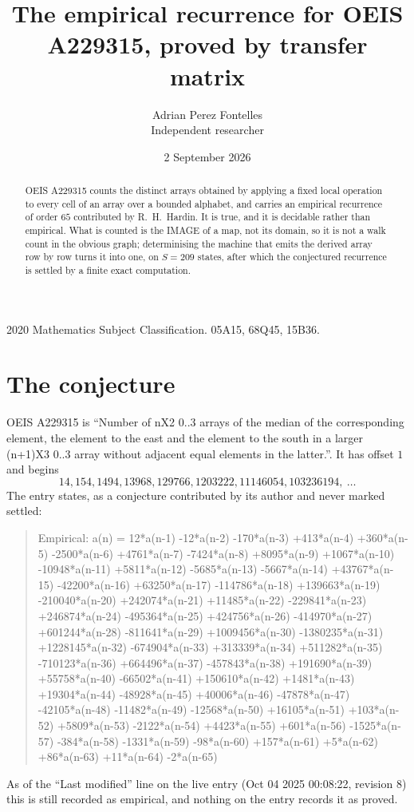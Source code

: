 \documentclass[11pt,a4paper]{article}
\title{The empirical recurrence for OEIS A229315, proved by transfer matrix}
\author{Adrian Perez Fontelles\\ \small Independent researcher}
\date{2 September 2026}
\theoremstyle{plain}
\theoremstyle{definition}
\begin{document}
\maketitle

\begin{abstract}
OEIS A229315 counts the distinct arrays obtained by applying a fixed local operation to every cell
of an array over a bounded alphabet, and carries an empirical recurrence of order $65$
contributed by R.~H.~Hardin. It is true, and it is decidable rather than empirical. What is
counted is the IMAGE of a map, not its domain, so it is not a walk count in the obvious graph;
determinising the machine that emits the derived array row by row turns it into one, on
$S=209$ states, after which the conjectured recurrence is settled by a finite exact
computation.
\end{abstract}

\noindent\small 2020 Mathematics Subject Classification. 05A15, 68Q45, 15B36.\normalsize

\section{The conjecture}

OEIS A229315 is ``Number of nX2 0..3 arrays of the median of the corresponding element, the element to the east and the element to the south in a larger (n+1)X3 0..3 array without adjacent equal elements in the latter.''. It has offset $1$ and begins
\[
14, 154, 1494, 13968, 129766, 1203222, 11146054, 103236194,\ \dots
\]
The entry states, as a conjecture contributed by its author and never marked settled:
\begin{quote}
Empirical: a(n) = 12*a(n-1) -12*a(n-2) -170*a(n-3) +413*a(n-4) +360*a(n-5) -2500*a(n-6) +4761*a(n-7) -7424*a(n-8) +8095*a(n-9) +1067*a(n-10) -10948*a(n-11) +5811*a(n-12) -5685*a(n-13) -5667*a(n-14) +43767*a(n-15) -42200*a(n-16) +63250*a(n-17) -114786*a(n-18) +139663*a(n-19) -210040*a(n-20) +242074*a(n-21) +11485*a(n-22) -229841*a(n-23) +246874*a(n-24) -495364*a(n-25) +424756*a(n-26) -414970*a(n-27) +601244*a(n-28) -811641*a(n-29) +1009456*a(n-30) -1380235*a(n-31) +1228145*a(n-32) -674904*a(n-33) +313339*a(n-34) +511282*a(n-35) -710123*a(n-36) +664496*a(n-37) -457843*a(n-38) +191690*a(n-39) +55758*a(n-40) -66502*a(n-41) +150610*a(n-42) +1481*a(n-43) +19304*a(n-44) -48928*a(n-45) +40006*a(n-46) -47878*a(n-47) -42105*a(n-48) -11482*a(n-49) -12568*a(n-50) +16105*a(n-51) +103*a(n-52) +5809*a(n-53) -2122*a(n-54) +4423*a(n-55) +601*a(n-56) -1525*a(n-57) -384*a(n-58) -1331*a(n-59) -98*a(n-60) +157*a(n-61) +5*a(n-62) +86*a(n-63) +11*a(n-64) -2*a(n-65)
\end{quote}
As of the ``Last modified'' line on the live entry (Oct 04 2025 00:08:22, revision 8) this is still
recorded as empirical, and nothing on the entry records it as proved.
\end{document}
